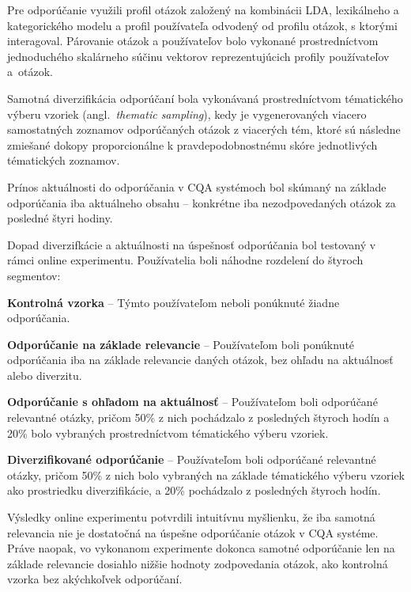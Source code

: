 Pre odporúčanie využili profil otázok založený na kombinácii LDA, lexikálneho a kategorického modelu a profil používateľa
odvodený od profilu otázok, s ktorými interagoval. Párovanie otázok a používateľov bolo vykonané prostredníctvom jednoduchého
skalárneho súčinu vektorov reprezentujúcich profily používateľov a~otázok.

Samotná diverzifikácia odporúčaní bola vykonávaná prostredníctvom tématického výberu vzoriek (angl.~\emph{thematic sampling}),
kedy je vygenerovaných viacero samostatných zoznamov odporúčaných otázok z viacerých tém, ktoré sú následne zmiešané dokopy
proporcionálne k pravdepodobnostnému skóre jednotlivých tématických zoznamov.

Prínos aktuálnosti do odporúčania v CQA systémoch bol skúmaný na základe odporúčania iba aktuálneho obsahu -- konkrétne
iba nezodpovedaných otázok za posledné štyri hodiny.

Dopad diverzifkácie a aktuálnosti na úspešnosť odporúčania bol testovaný v rámci online experimentu. Používatelia boli náhodne
rozdelení do štyroch segmentov:

\begin{my_enumerate}
  \item{\textbf{Kontrolná vzorka} -- Týmto používateľom neboli ponúknuté žiadne odporúčania.}
  \item{\textbf{Odporúčanie na základe relevancie} -- Používateľom boli ponúknuté odporúčania iba na základe relevancie
        daných otázok, bez ohľadu na aktuálnosť alebo diverzitu.}
  \item{\textbf{Odporúčanie s ohľadom na aktuálnosť} -- Používateľom boli odporúčané relevantné otázky, pričom 50\% z nich
        pochádzalo z posledných štyroch hodín a 20\% bolo vybraných prostredníctvom tématického výberu vzoriek.}
  \item{\textbf{Diverzifikované odporúčanie} -- Používateľom boli odporúčané relevantné otázky, pričom 50\% z nich
        bolo vybraných na základe tématického výberu vzoriek ako prostriedku diverzifikácie, a 20\% pochádzalo z posledných
        štyroch hodín.}
\end{my_enumerate}

Výsledky online experimentu potvrdili intuitívnu myšlienku, že iba samotná relevancia nie je dostatočná na úspešne
odporúčanie otázok v CQA systéme. Práve naopak, vo vykonanom experimente dokonca samotné odporúčanie len na základe
relevancie dosiahlo nižšie hodnoty zodpovedania otázok, ako kontrolná vzorka bez akýchkoľvek odporúčaní.

